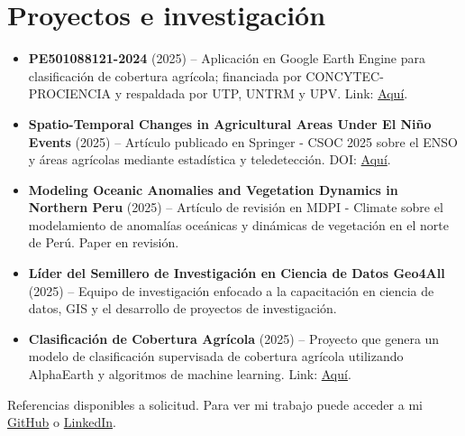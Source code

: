 \documentclass[11pt,a4paper]{article}
\begin{document}
\section*{Proyectos e investigación}
\begin{itemize}[left=15pt]
  \item \textbf{PE501088121-2024} (2025) -- Aplicación en Google Earth Engine para clasificación de cobertura agrícola; financiada por CONCYTEC-PROCIENCIA y respaldada por UTP, UNTRM y UPV. Link: \href{https://ee-hsluis4326.projects.earthengine.app/view/utpndvivstsm}{Aquí}.
  \item \textbf{Spatio-Temporal Changes in Agricultural Areas Under El Niño Events} (2025) -- Artículo publicado en Springer - CSOC 2025 sobre el ENSO y áreas agrícolas mediante estadística y teledetección. DOI: \href{https://doi.org/10.1007/978-3-032-04581-2_25}{Aquí}.
  \item \textbf{Modeling Oceanic Anomalies and Vegetation Dynamics in Northern Peru} (2025) -- Artículo de revisión en MDPI - Climate sobre el modelamiento de anomalías oceánicas y dinámicas de vegetación en el norte de Perú. Paper en revisión.
  \item \textbf{Líder del Semillero de Investigación en Ciencia de Datos Geo4All} (2025) -- Equipo de investigación enfocado a la capacitación en ciencia de datos, GIS y el desarrollo de proyectos de investigación.
  \item \textbf{Clasificación de Cobertura Agrícola} (2025) -- Proyecto que genera un modelo de clasificación supervisada de cobertura agrícola utilizando AlphaEarth y algoritmos de machine learning. Link: \href{https://github.com/1nfinit0/AlphaEarth-RandomForest-classifier---Lambayeque}{Aquí}.
\end{itemize}
\begin{center}
  Referencias disponibles a solicitud. Para ver mi trabajo puede acceder a mi \href{https://github.com/1nfinit0}{GitHub} o \href{https://www.linkedin.com/in/lhuatay/}{LinkedIn}.
\end{center}
\newpage
\end{document}
